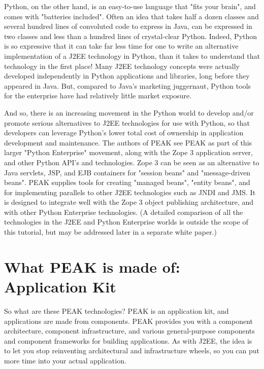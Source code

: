 Python, on the other hand, is an easy-to-use language that "fits your
brain", and comes with "batteries included".  Often an idea that takes
half a dozen classes and several hundred lines of convoluted code to
express in Java, can be expressed in two classes and less than a hundred
lines of crystal-clear Python.  Indeed, Python is so expressive that it
can take far less time for one to write an alternative implementation of
a J2EE technology in Python, than it takes to understand that technology
in the first place!  Many J2EE technology concepts were actually
developed independently in Python applications and libraries, long
before they appeared in Java.  But, compared to Java's marketing
juggernaut, Python tools for the enterprise have had relatively little
market exposure. 

And so, there is an increasing movement in the Python world to develop
and/or promote serious alternatives to J2EE technologies for use with
Python, so that developers can leverage Python's lower total cost of
ownership in application development and maintenance. The authors of
PEAK see PEAK as part of this larger "Python Enterprise" movement, along
with the Zope 3 application server, and other Python API's and
technologies. Zope 3 can be seen as an alternative to Java servlets,
JSP, and EJB containers for "session beans" and "message-driven beans".
PEAK supplies tools for creating "managed beans", "entity beans", and
for implementing parallels to other J2EE technologies such as JNDI and
JMS.  It is designed to integrate well with the Zope 3 object publishing
architecture, and with other Python Enterprise technologies. (A detailed
comparison of all the technologies in the J2EE and Python Enterprise
worlds is outside the scope of this tutorial, but may be addressed later
in a separate white paper.) 


\section{What PEAK is made of: Application Kit} 

So what are these PEAK technologies? PEAK is an application kit, and
applications are made from components.  PEAK provides you with a
component architecture, component infrastructure, and various
general-purpose components and component frameworks for building
applications. As with J2EE, the idea is to let you stop reinventing
architectural and infrastructure wheels, so you can put more time into
your actual application. 

